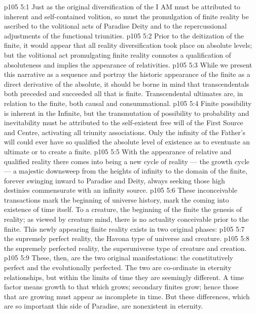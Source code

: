 \vs p105 5:1 Just as the original diversification of the I AM must be attributed to inherent and self\hyp{}contained volition, so must the promulgation of finite reality be ascribed to the volitional acts of Paradise Deity and to the repercussional adjustments of the functional triunities.
\vs p105 5:2 Prior to the deitization of the finite, it would appear that all reality diversification took place on absolute levels; but the volitional act promulgating finite reality connotes a qualification of absoluteness and implies the appearance of relativities.
\vs p105 5:3 \pc While we present this narrative as a sequence and portray the historic appearance of the finite as a direct derivative of the absolute, it should be borne in mind that transcendentals both preceded and succeeded all that is finite. Transcendental ultimates are, in relation to the finite, both causal and consummational.
\vs p105 5:4 \pc Finite possibility is inherent in the Infinite, but the transmutation of possibility to probability and inevitability must be attributed to the self\hyp{}existent free will of the First Source and Centre, activating all triunity associations. Only the infinity of the Father’s will could ever have so qualified the absolute level of existence as to eventuate an ultimate or to create a finite.
\vs p105 5:5 With the appearance of relative and qualified reality there comes into being a new cycle of reality --- the growth cycle --- a majestic downsweep from the heights of infinity to the domain of the finite, forever swinging inward to Paradise and Deity, always seeking those high destinies commensurate with an infinity source.
\vs p105 5:6 These inconceivable transactions mark the beginning of universe history, mark the coming into existence of time itself. To a creature, the beginning of the finite  the genesis of reality; as viewed by creature mind, there is no actuality conceivable prior to the finite. This newly appearing finite reality exists in two original phases:
\vs p105 5:7 \bibnobreakspace {} the supremely perfect reality, the Havona type of universe and creature.
\vs p105 5:8 \bibnobreakspace {} the supremely perfected reality, the superuniverse type of creature and creation.
\vs p105 5:9 \pc These, then, are the two original manifestations: the constitutively perfect and the evolutionally perfected. The two are co\hyp{}ordinate in eternity relationships, but within the limits of time they are seemingly different. A time factor means growth to that which grows; secondary finites grow; hence those that are growing must appear as incomplete in time. But these differences, which are so important this side of Paradise, are nonexistent in eternity.
